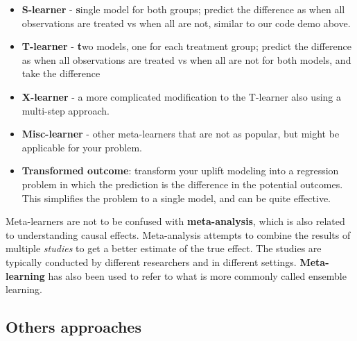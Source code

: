 \documentclass[
  letterpaper,
]{krantz}
\providecommand{\tightlist}{%
  \setlength{\itemsep}{0pt}\setlength{\parskip}{0pt}}\usepackage{longtable,booktabs,array}
\begin{document}
\begin{itemize}
\tightlist
\item
  \textbf{S-learner} - \textbf{s}ingle model for both groups; predict
  the difference as when all observations are treated vs when all are
  not, similar to our code demo above.
\item
  \textbf{T-learner} - \textbf{t}wo models, one for each treatment
  group; predict the difference as when all observations are treated vs
  when all are not for both models, and take the difference
\item
  \textbf{X-learner} - a more complicated modification to the T-learner
  also using a multi-step approach.
\item
  \textbf{Misc-learner} - other meta-learners that are not as popular,
  but might be applicable for your problem.
\item
  \textbf{Transformed outcome}: transform your uplift modeling into a
  regression problem in which the prediction is the difference in the
  potential outcomes. This simplifies the problem to a single model, and
  can be quite effective.
\end{itemize}

\begin{tcolorbox}[enhanced jigsaw, toprule=.15mm, colback=white, breakable, rightrule=.15mm, arc=.35mm, bottomrule=.15mm, opacityback=0, colframe=quarto-callout-note-color-frame, leftrule=.75mm, left=2mm]
\begin{minipage}[t]{5.5mm}
\textcolor{quarto-callout-note-color}{\faInfo}
\end{minipage}%
\begin{minipage}[t]{\textwidth - 5.5mm}

Meta-learners are not to be confused with \textbf{meta-analysis}, which
is also related to understanding causal effects. Meta-analysis attempts
to combine the results of multiple \emph{studies} to get a better
estimate of the true effect. The studies are typically conducted by
different researchers and in different settings. \textbf{Meta-learning}
has also been used to refer to what is more commonly called ensemble
learning.

\end{minipage}%
\end{tcolorbox}

\subsection{Others approaches}\label{others-approaches}
\end{document}
